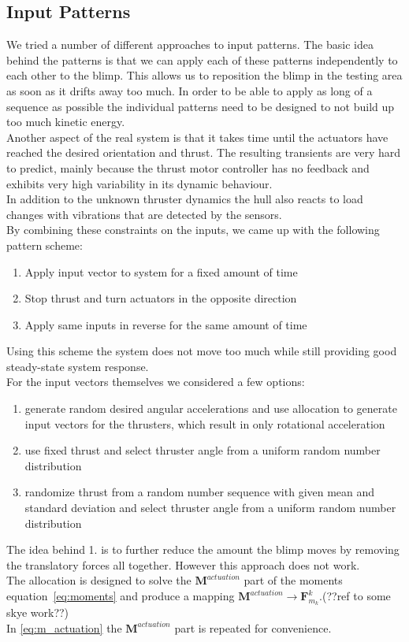 \subsection{Input Patterns}
\label{sub:input_pattern}
We tried a number of different approaches to input patterns.
The basic idea behind the patterns is that we can apply each of these patterns independently to each other to the blimp.
This allows us to reposition the blimp in the testing area as soon as it drifts away too much.
In order to be able to apply as long of a sequence as possible the individual patterns need to be designed to not build up too much kinetic energy.\\
Another aspect of the real system is that it takes time until the actuators have reached the desired orientation and thrust.
The resulting transients are very hard to predict, mainly because the thrust motor controller has no feedback and exhibits very high variability in its dynamic behaviour. \\
In addition to the unknown thruster dynamics the hull also reacts to load changes with vibrations that are detected by the sensors. \\
By combining these constraints on the inputs, we came up with the following pattern scheme:
\begin{enumerate}
\item Apply input vector to system for a fixed amount of time
\item Stop thrust and turn actuators in the opposite direction
\item Apply same inputs in reverse for the same amount of time
\end{enumerate}
Using this scheme the system does not move too much while still providing good steady-state system response. \\
For the input vectors themselves we considered a few options:
\begin{enumerate}
\item generate random desired angular accelerations and use allocation to generate input vectors for the thrusters, which result in only rotational acceleration
\item use fixed thrust and select thruster angle from a uniform random number distribution
\item randomize thrust from a random number sequence with given mean and standard deviation and select thruster angle from a uniform random number distribution
\end{enumerate}
The idea behind 1. is to further reduce the amount the blimp moves by removing the translatory forces all together. 
However this approach does not work.\\
The allocation is designed to solve the $\mathbf{M}^{actuation}$ part of the moments equation~\ref{eq:moments} and produce a mapping $\mathbf{M}^{actuation} \rightarrow \mathbf{F}^k_{m_k}$.(??ref to some skye work??)\\
In \ref{eq:m_actuation} the $\mathbf{M}^{actuation}$ part is repeated for convenience.

